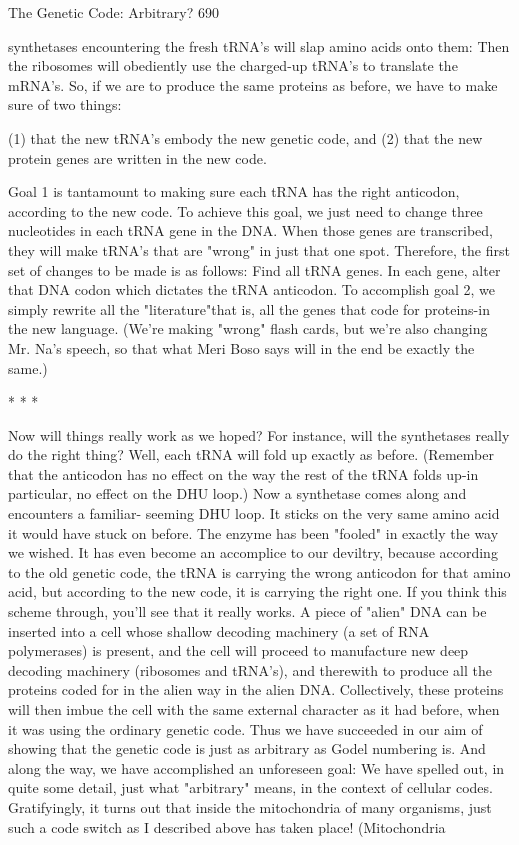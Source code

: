 The Genetic Code: Arbitrary?                                                           690

synthetases encountering the fresh tRNA's will slap amino acids onto them: Then the
ribosomes will obediently use the charged-up tRNA's to translate the mRNA's. So, if
we are to produce the same proteins as before, we have to make sure of two things:

       (1) that the new tRNA's embody the new genetic code, and
       (2) that the new protein genes are written in the new code.

        Goal 1 is tantamount to making sure each tRNA has the right anticodon,
according to the new code. To achieve this goal, we just need to change three
nucleotides in each tRNA gene in the DNA. When those genes are transcribed, they
will make tRNA's that are "wrong" in just that one spot. Therefore, the first set of
changes to be made is as follows: Find all tRNA genes. In each gene, alter that DNA
codon which dictates the tRNA anticodon. To accomplish goal 2, we simply rewrite
all the "literature"that is, all the genes that code for proteins-in the new language.
(We're making "wrong" flash cards, but we're also changing Mr. Na's speech, so that
what Meri Boso says will in the end be exactly the same.)

                                       *   *   *

        Now will things really work as we hoped? For instance, will the synthetases
really do the right thing? Well, each tRNA will fold up exactly as before. (Remember
that the anticodon has no effect on the way the rest of the tRNA folds up-in particular,
no effect on the DHU loop.) Now a synthetase comes along and encounters a familiar-
seeming DHU loop. It sticks on the very same amino acid it would have stuck on
before. The enzyme has been "fooled" in exactly the way we wished. It has even
become an accomplice to our deviltry, because according to the old genetic code, the
tRNA is carrying the wrong anticodon for that amino acid, but according to the new
code, it is carrying the right one.
        If you think this scheme through, you'll see that it really works. A piece of
"alien" DNA can be inserted into a cell whose shallow decoding machinery (a set of
RNA polymerases) is present, and the cell will proceed to manufacture new deep
decoding machinery (ribosomes and tRNA's), and therewith to produce all the
proteins coded for in the alien way in the alien DNA. Collectively, these proteins will
then imbue the cell with the same external character as it had before, when it was
using the ordinary genetic code.
        Thus we have succeeded in our aim of showing that the genetic code is just as
arbitrary as Godel numbering is. And along the way, we have accomplished an
unforeseen goal: We have spelled out, in quite some detail, just what "arbitrary"
means, in the context of cellular codes.
        Gratifyingly, it turns out that inside the mitochondria of many organisms, just
such a code switch as I described above has taken place! (Mitochondria





